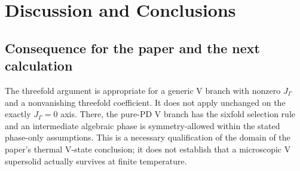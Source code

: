 \clearpage

\section{Discussion and Conclusions}\label{sec-nbcp-discussion}

\subsection{Consequence for the paper and the next
calculation}\label{consequence-for-the-paper-and-the-next-calculation}

The threefold argument is appropriate for a generic V branch with
nonzero \(J_\Gamma\) and a nonvanishing threefold coefficient. It does
not apply unchanged on the exactly \(J_\Gamma=0\) axis. There, the
pure-PD V branch has the sixfold selection rule and an intermediate
algebraic phase is symmetry-allowed within the stated phase-only
assumptions. This is a necessary qualification of the domain of the
paper's thermal V-state conclusion; it does not establish that a
microscopic V supersolid actually survives at finite temperature.

